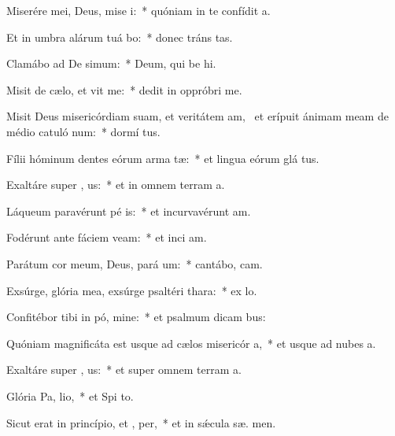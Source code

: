 \item Miserére mei, Deus, mise i:~* quóniam in te confídit  a.
\item Et in umbra alárum tuá bo:~* donec tráns tas.
\item Clamábo ad De simum:~* Deum, qui be hi.
\item Misit de cælo, et vit me:~* dedit in oppróbri  me.
\item Misit Deus misericórdiam suam, et veritátem am,~\pscross{} et erípuit ánimam meam de médio catuló num:~* dormí tus.
\item Fílii hóminum dentes eórum arma  tæ:~* et lingua eórum glá tus.
\item Exaltáre super , us:~* et in omnem terram  a.
\item Láqueum paravérunt pé is:~* et incurvavérunt  am.
\item Fodérunt ante fáciem  veam:~* et inci  am.
\item Parátum cor meum, Deus, pará  um:~* cantábo,   cam.
\item Exsúrge, glória mea, exsúrge psaltéri  thara:~* ex lo.
\item Confitébor tibi in pó, mine:~* et psalmum dicam   bus:
\item Quóniam magnificáta est usque ad cælos misericór a,~* et usque ad nubes  a.
\item Exaltáre super , us:~* et super omnem terram  a.
\item Glória Pa,  lio,~* et Spi to.
\item Sicut erat in princípio, et ,  per,~* et in sǽcula sæ. men.

